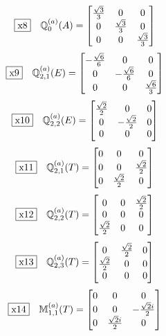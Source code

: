 \documentclass[fleqn,10pt,landscape]{jsarticle}
\begin{document}
\begin{dmath*}
\fbox{x8}\quad \mathbb{Q}_{0}^{(a)}(A)=\begin{bmatrix} \frac{\sqrt{3}}{3} & 0 & 0 \\ 0 & \frac{\sqrt{3}}{3} & 0 \\ 0 & 0 & \frac{\sqrt{3}}{3} \end{bmatrix}
\end{dmath*}
\begin{dmath*}
\fbox{x9}\quad \mathbb{Q}_{2,1}^{(a)}(E)=\begin{bmatrix} - \frac{\sqrt{6}}{6} & 0 & 0 \\ 0 & - \frac{\sqrt{6}}{6} & 0 \\ 0 & 0 & \frac{\sqrt{6}}{3} \end{bmatrix}
\end{dmath*}
\begin{dmath*}
\fbox{x10}\quad \mathbb{Q}_{2,2}^{(a)}(E)=\begin{bmatrix} \frac{\sqrt{2}}{2} & 0 & 0 \\ 0 & - \frac{\sqrt{2}}{2} & 0 \\ 0 & 0 & 0 \end{bmatrix}
\end{dmath*}
\begin{dmath*}
\fbox{x11}\quad \mathbb{Q}_{2,1}^{(a)}(T)=\begin{bmatrix} 0 & 0 & 0 \\ 0 & 0 & \frac{\sqrt{2}}{2} \\ 0 & \frac{\sqrt{2}}{2} & 0 \end{bmatrix}
\end{dmath*}
\begin{dmath*}
\fbox{x12}\quad \mathbb{Q}_{2,2}^{(a)}(T)=\begin{bmatrix} 0 & 0 & \frac{\sqrt{2}}{2} \\ 0 & 0 & 0 \\ \frac{\sqrt{2}}{2} & 0 & 0 \end{bmatrix}
\end{dmath*}
\begin{dmath*}
\fbox{x13}\quad \mathbb{Q}_{2,3}^{(a)}(T)=\begin{bmatrix} 0 & \frac{\sqrt{2}}{2} & 0 \\ \frac{\sqrt{2}}{2} & 0 & 0 \\ 0 & 0 & 0 \end{bmatrix}
\end{dmath*}
\begin{dmath*}
\fbox{x14}\quad \mathbb{M}_{1,1}^{(a)}(T)=\begin{bmatrix} 0 & 0 & 0 \\ 0 & 0 & - \frac{\sqrt{2} i}{2} \\ 0 & \frac{\sqrt{2} i}{2} & 0 \end{bmatrix}
\end{dmath*}
\end{document}
